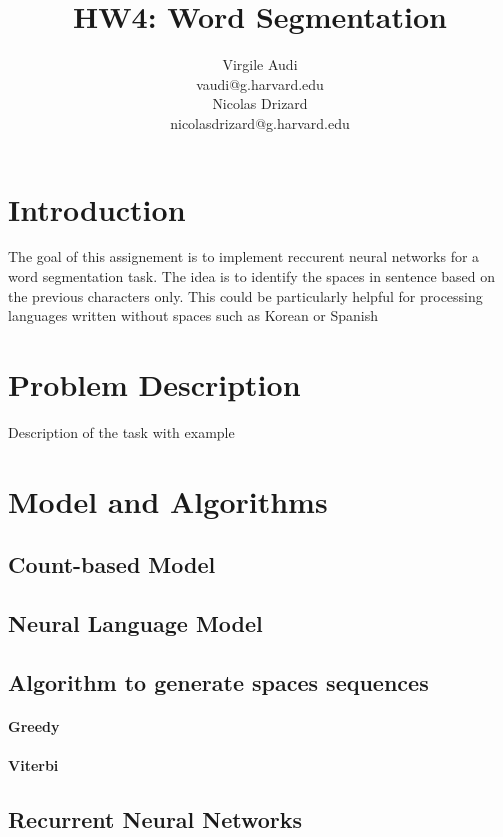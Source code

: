 \documentclass[11pt]{article}
\title{HW4: Word Segmentation}
\author{Virgile Audi \\ vaudi@g.harvard.edu \\ Nicolas Drizard \\ nicolasdrizard@g.harvard.edu}
\begin{document}
\maketitle{}
\section{Introduction}

The goal of this assignement is to implement reccurent neural networks for a word segmentation task. The idea is to identify the spaces in sentence based on the previous characters only. This could be particularly helpful for processing languages written without spaces such as Korean or Spanish


\section{Problem Description}

Description of the task with example



\section{Model and Algorithms}

\subsection{Count-based Model}

\subsection{Neural Language Model}

\subsection{Algorithm to generate spaces sequences}
\paragraph{Greedy}

\paragraph{Viterbi}

\subsection{Recurrent Neural Networks}
\end{document}
